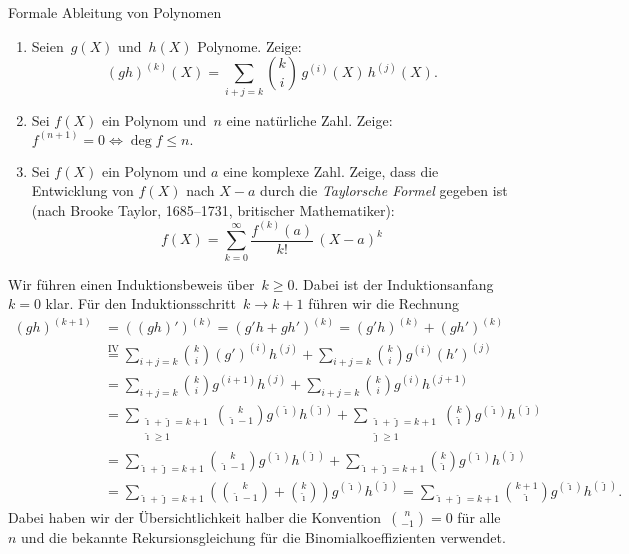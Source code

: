 \documentclass{algblatt}
\begin{document}
\begin{aufgabe}{Formale Ableitung von Polynomen}
\begin{enumerate}
\item Seien~$g(X)$ und~$h(X)$ Polynome. Zeige:
\[ (g h)^{(k)}(X)
  = \sum_{i + j = k} \binom k i \, g^{(i)}(X) \, h^{(j)}(X).
\]

\item Sei $f(X)$ ein Polynom und~$n$ eine natürliche Zahl. Zeige:
$f^{(n + 1)} = 0 \Longleftrightarrow \deg f \leq n.$

\item Sei $f(X)$ ein Polynom und $a$ eine komplexe Zahl. Zeige, dass die
Entwicklung von $f(X)$ nach $X - a$ durch die \emph{Taylorsche Formel} gegeben
ist (nach Brooke Taylor, 1685--1731, britischer Mathematiker):
\[ f(X) = \sum_{k = 0}^\infty \frac{f^{(k)}(a)}{k!} \, (X - a)^k \]
\end{enumerate}

\ifloesungen\newpage\fi
\begin{loesungE}
\item Wir führen einen Induktionsbeweis über~$k \geq 0$.
Dabei ist der Induktionsanfang~$k = 0$ klar. Für den Induktionsschritt~$k \to k
+ 1$ führen wir die Rechnung
\begin{align*}
  (gh)^{(k+1)} &=
  ((gh)')^{(k)} = (g'h + gh')^{(k)} = (g'h)^{(k)} + (gh')^{(k)} \\
  &\stackrel{\text{IV}}{=}
    \sum_{i+j=k} \binom{k}{i} (g')^{(i)} h^{(j)} +
    \sum_{i+j=k} \binom{k}{i} g^{(i)} (h')^{(j)} \\
  &=
    \sum_{i+j=k} \binom{k}{i} g^{(i+1)} h^{(j)} +
    \sum_{i+j=k} \binom{k}{i} g^{(i)} h^{(j+1)} \\
  &=
    \sum_{\substack{\hat\imath+\hat\jmath=k+1\\\hat\imath\geq1}} \binom{k}{\hat\imath - 1} g^{(\hat\imath)} h^{(\hat\jmath)} +
    \sum_{\substack{\hat\imath+\hat\jmath=k+1\\\hat\jmath\geq1}} \binom{k}{\hat\imath} g^{(\hat\imath)} h^{(\hat\jmath)} \\
  &=
    \sum_{\hat\imath+\hat\jmath=k+1} \binom{k}{\hat\imath - 1} g^{(\hat\imath)} h^{(\hat\jmath)} +
    \sum_{\hat\imath+\hat\jmath=k+1} \binom{k}{\hat\imath} g^{(\hat\imath)} h^{(\hat\jmath)} \\
  &= \sum_{\hat\imath+\hat\jmath=k+1}
    \left(\binom{k}{\hat\imath - 1} + \binom{k}{\hat\imath}\right) g^{(\hat\imath)} h^{(\hat\jmath)}
  = \sum_{\hat\imath+\hat\jmath=k+1}
    \binom{k+1}{\hat\imath} g^{(\hat\imath)} h^{(\hat\jmath)}.
\end{align*}
Dabei haben wir der Übersichtlichkeit halber die Konvention~$\binom{n}{-1} = 0$
für alle~$n$ und die bekannte Rekursionsgleichung für die Binomialkoeffizienten
verwendet.


\end{loesungE}
\end{aufgabe}
\end{document}
